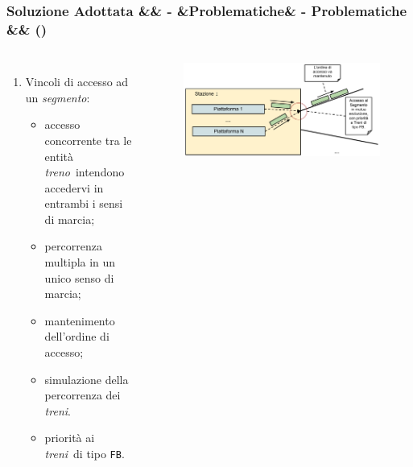 \documentclass[slidestop,compress,blackandwhite]{beamer}
\newcommand{\ttt}[1]{\texttt{#1}}
\newcommand{\ii}[1]{\textit{#1}}
\newcommand{\treno}{\ii{treno}}
\newcommand{\treni}{\ii{treni}}
\newcommand{\segmento}{\ii{segmento}}
\newcommand{\newtitle}[4]{
	#1 
	\ifx&#2&%
	\else
  		\large- #2
	\fi
	\ifx&#3&%
	\else
  		\normalsize- #3
	\fi
	\ifx&#4&%
	\else
  		\normalsize (#4)
	\fi
}
\newcommand{\newframe}[5]{
	\begin{frame}
		\frametitle{\newtitle{#1}{#2}{#3}{#4}}
		#5
	\end{frame}
}
\newcommand{\myitemize}[1]{\begin{itemize}#1\end{itemize}}
\begin{document}
	\newframe{Soluzione Adottata}{}{Problematiche}{}{
		
		\begin{columns}[c]
		\column{0.5\textwidth}
		\begin{enumerate}
			\item Vincoli di accesso ad un \segmento:
				\myitemize{
					\item accesso concorrente tra le entità \treno~intendono accedervi in entrambi i sensi di marcia;
					\item percorrenza multipla in un unico senso di marcia;
					\item mantenimento dell'ordine di accesso;
					\item simulazione della percorrenza dei \treni.
					\item priorità ai \treni~di tipo \ttt{FB}.
				}
		\end{enumerate}
		\column{0.5\textwidth}
		\begin{figure}
			\includegraphics[scale=0.26,trim=0mm 5mm 0mm 35mm]{imgs/ingresso_segmento.pdf}
		\end{figure}
		\end{columns}
	}
	
\end{document}

